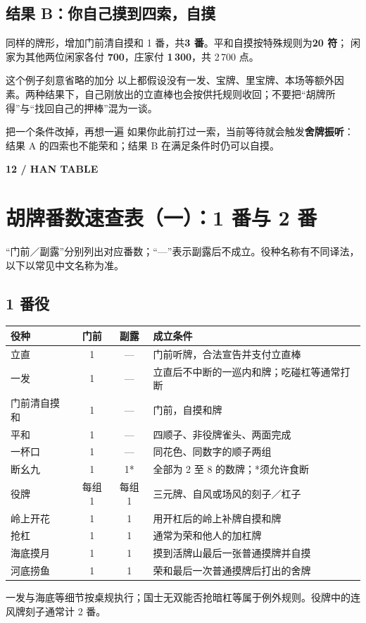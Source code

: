 \documentclass[UTF8,a4paper,zihao=5,fontset=fandol]{ctexart}
\newcommand{\pageintro}[3]{\clearpage\phantomsection\label{#1}
 {\small\sffamily\bfseries\color{gold}#2}\par\vspace{2pt}\section{#3}}
\newcommand{\smalltext}[1]{{\small\color{muted}#1}}
\begin{document}
\subsection{结果 B：你自己摸到四索，自摸}
同样的牌形，增加门前清自摸和 1 番，共\textbf{3 番}。平和自摸按特殊规则为\textbf{20 符}；
闲家为其他两位闲家各付 \textbf{700}，庄家付 \textbf{1\,300}，共 2\,700 点。

\begin{note}{这个例子刻意省略的加分}
以上都假设没有一发、宝牌、里宝牌、本场等额外因素。两种结果下，自己刚放出的立直棒也会按供托规则收回；不要把“胡牌所得”与“找回自己的押棒”混为一谈。
\end{note}
\begin{alert}{把一个条件改掉，再想一遍}
如果你此前打过一索，当前等待就会触发\textbf{舍牌振听}：结果 A 的四索也不能荣和；结果 B 在满足条件时仍可以自摸。
\end{alert}

\pageintro{hantable}{12 / HAN TABLE}{胡牌番数速查表（一）：1 番与 2 番}
\smalltext{“门前／副露”分别列出对应番数；“—”表示副露后不成立。役种名称有不同译法，以下以常见中文名称为准。}
\subsection{1 番役}
{\small
\par\noindent\begin{tabularx}{\linewidth}{L{25mm}c c Y}
\toprule
役种 & 门前 & 副露 & 成立条件\\
\midrule
立直 & 1 & — & 门前听牌，合法宣告并支付立直棒\\
一发 & 1 & — & 立直后不中断的一巡内和牌；吃碰杠等通常打断\\
门前清自摸和 & 1 & — & 门前，自摸和牌\\
平和 & 1 & — & 四顺子、非役牌雀头、两面完成\\
一杯口 & 1 & — & 同花色、同数字的顺子两组\\
断幺九 & 1 & 1* & 全部为 2 至 8 的数牌；*须允许食断\\
役牌 & 每组 1 & 每组 1 & 三元牌、自风或场风的刻子／杠子\\
岭上开花 & 1 & 1 & 用开杠后的岭上补牌自摸和牌\\
抢杠 & 1 & 1 & 通常为荣和他人的加杠牌\\
海底摸月 & 1 & 1 & 摸到活牌山最后一张普通摸牌并自摸\\
河底捞鱼 & 1 & 1 & 荣和最后一次普通摸牌后打出的舍牌\\
\bottomrule
\end{tabularx}\par\vspace{3pt}}
\smalltext{一发与海底等细节按桌规执行；国士无双能否抢暗杠等属于例外规则。役牌中的连风牌刻子通常计 2 番。}
\end{document}
